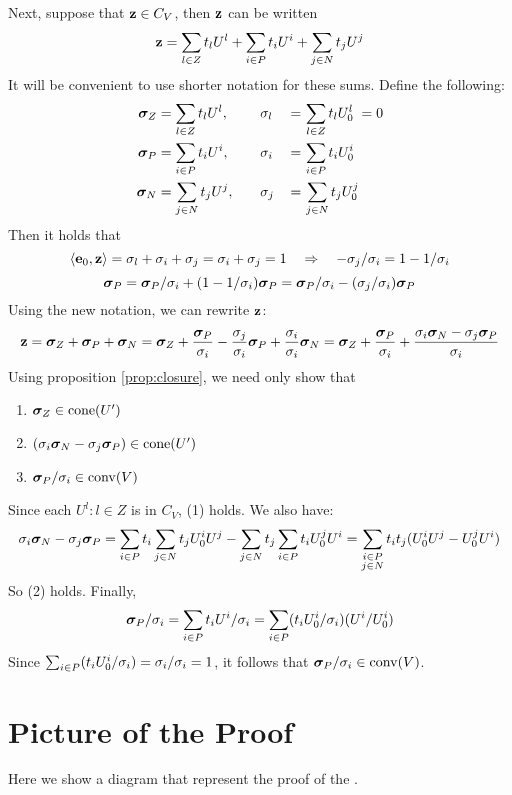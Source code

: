 Next, suppose that $\mathbf{z} \in C_V$, then $\mathbf{z}$ can be written
\[ \mathbf{z} = \sum_{l\in Z} t_l U^l + \sum_{i\in P} t_i U^i + \sum_{j\in N} t_j U^j \]
It will be convenient to use shorter notation for these sums.  Define the following:
\begin{alignat*}{3}
	\bm{\sigma}_Z & = \sum_{l\in Z} t_l U^l, \quad &  & \sigma_l \, & = & \, \sum_{l\in Z} t_l U^l_{0} \;= 0 \\
	\bm{\sigma}_P & = \sum_{i\in P} t_i U^i, \quad &  & \sigma_i \, & = & \, \sum_{i\in P} t_i U^i_{0}       \\
	\bm{\sigma}_N & = \sum_{j\in N} t_j U^j, \quad &  & \sigma_j \, & = & \, \sum_{j\in N} t_j U^j_{0}
\end{alignat*}
Then it holds that
\[ \left\langle \mathbf{e}_0, \mathbf{z} \right\rangle = \sigma_l + \sigma_i + \sigma_j = \sigma_i + \sigma_j = 1
	\quad\Rightarrow\quad -\sigma_j/\sigma_i = 1 - 1/\sigma_i \]
\[ \bm{\sigma}_P = \bm{\sigma}_P/\sigma_i + (1-1/\sigma_i)\bm{\sigma}_P
	= \bm{\sigma}_P/\sigma_i - (\sigma_j/\sigma_i)\bm{\sigma}_P \]
Using the new notation, we can rewrite $\mathbf{z}$:
\[ \mathbf{z} = \bm{\sigma}_Z + \bm{\sigma}_P + \bm{\sigma}_N
	= \bm{\sigma}_Z + \frac{\bm{\sigma}_P}{\sigma_i} - \frac{\sigma_j}{\sigma_i}\bm{\sigma}_P
	+ \frac{\sigma_i}{\sigma_i}\bm{\sigma}_N
	= \bm{\sigma}_Z + \frac{\bm{\sigma}_P}{\sigma_i} +
	\frac{\sigma_i\bm{\sigma}_N - \sigma_j\bm{\sigma}_P}{\sigma_i}
\]
Using proposition \ref{prop:closure}, we need only show that
\begin{enumerate}
	\item $\bm{\sigma}_Z \in \operatorname{cone}(U')$
	\item $(\sigma_i\bm{\sigma}_N - \sigma_j\bm{\sigma}_P) \in \operatorname{cone}(U')$
	\item $\bm{\sigma}_P/\sigma_i \in \operatorname{conv}(V)$
\end{enumerate}
Since each $U^l : l \in Z$ is in $C_V$, (1) holds.  We also have:
\[ \sigma_i\bm{\sigma}_N - \sigma_j\bm{\sigma}_P =
	\sum_{i\in P} t_i \sum_{j\in N} t_j U^i_{0} U^j - \sum_{j\in N} t_j \sum_{i\in P} t_i U^j_{0} U^i =
	\sum_{\substack{i\in P \\ j\in N}} t_i t_j(U^i_{0} U^j - U^j_{0} U^i) \]
So (2) holds.  Finally,
\[ \bm{\sigma}_P/\sigma_i = \sum_{i\in P} t_i U^i / \sigma_i = \sum_{i\in P} (t_i U^i_{0}/\sigma_i)(U^i/U^i_{0}) \]
Since $\sum_{i\in P} (t_i U^i_{0}/\sigma_i) = \sigma_i / \sigma_i = 1$, it follows that $\bm{\sigma}_P / \sigma_i \in \operatorname{conv}(V)$.

\section{Picture of the Proof}
Here we show a diagram that represent the proof of the {\MWT}.

